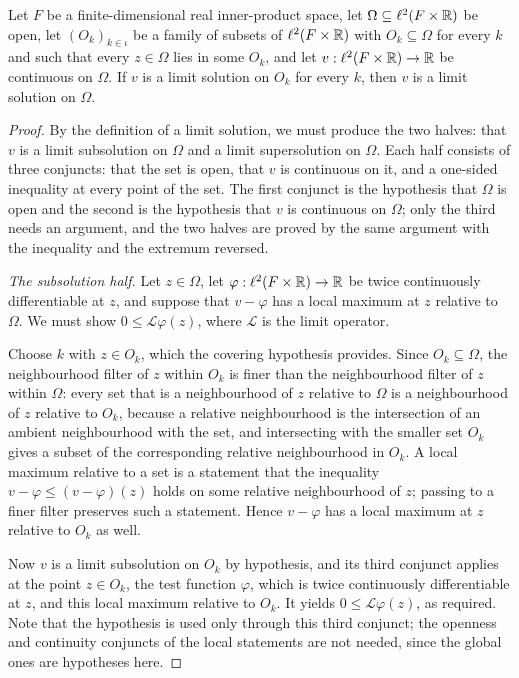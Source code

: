 \begin{lemma}
Let $F$ be a finite-dimensional real inner-product space, let
$\Omega\subseteq\ell^2(F\times\mathbb{R})$ be open, let $(O_k)_{k\in\iota}$ be a family of
subsets of $\ell^2(F\times\mathbb{R})$ with $O_k\subseteq\Omega$ for every $k$ and such
that every $z\in\Omega$ lies in some $O_k$, and let
$v:\ell^2(F\times\mathbb{R})\to\mathbb{R}$ be continuous on $\Omega$. If $v$ is a limit solution
on $O_k$ for every $k$, then $v$ is a limit solution on $\Omega$.
\end{lemma}
\begin{proof}
By the definition of a limit solution, we must produce the two halves: that $v$ is
a limit subsolution on $\Omega$ and a limit supersolution on $\Omega$. Each half
consists of three conjuncts: that the set is open, that $v$ is continuous on it,
and a one-sided inequality at every point of the set. The first conjunct is the
hypothesis that $\Omega$ is open and the second is the hypothesis that $v$ is
continuous on $\Omega$; only the third needs an argument, and the two halves are
proved by the same argument with the inequality and the extremum reversed.

\emph{The subsolution half.}
Let $z\in\Omega$, let $\varphi:\ell^2(F\times\mathbb{R})\to\mathbb{R}$ be twice continuously
differentiable at $z$, and suppose that $v-\varphi$ has a local maximum at $z$
relative to $\Omega$. We must show $0\le\mathcal L\varphi(z)$, where
$\mathcal L$ is the limit operator.

Choose $k$ with $z\in O_k$, which the covering hypothesis provides. Since
$O_k\subseteq\Omega$, the neighbourhood filter of $z$ within $O_k$ is finer than
the neighbourhood filter of $z$ within $\Omega$: every set that is a
neighbourhood of $z$ relative to $\Omega$ is a neighbourhood of $z$ relative to
$O_k$, because a relative neighbourhood is the intersection of an ambient
neighbourhood with the set, and intersecting with the smaller set $O_k$ gives a
subset of the corresponding relative neighbourhood in $O_k$. A local maximum
relative to a set is a statement that the inequality $v-\varphi\le(v-\varphi)(z)$
holds on some relative neighbourhood of $z$; passing to a finer filter preserves
such a statement. Hence $v-\varphi$ has a local maximum at $z$ relative to
$O_k$ as well.

Now $v$ is a limit subsolution on $O_k$ by hypothesis, and its third conjunct
applies at the point $z\in O_k$, the test function $\varphi$, which is twice
continuously differentiable at $z$, and this local maximum relative to $O_k$. It
yields $0\le\mathcal L\varphi(z)$, as required. Note that the hypothesis is used
only through this third conjunct; the openness and continuity conjuncts of the
local statements are not needed, since the global ones are hypotheses here.


\end{proof}
